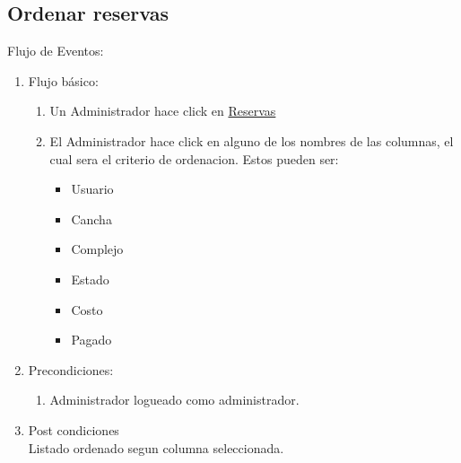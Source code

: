 \documentclass[a4paper,11pt]{article}
\begin{document}
\subsection{Ordenar reservas}

    \item Flujo de Eventos: 

    \begin{enumerate}

        \item Flujo básico:
	\begin{enumerate}
            \item Un Administrador hace click en \underline{Reservas}
	    \item El Administrador hace click en alguno de los nombres de las columnas, el cual sera el criterio de ordenacion.
Estos pueden ser:
	\begin{itemize}
	 \item Usuario
	\item Cancha
	\item Complejo
	\item Estado
	\item Costo
	\item Pagado
	\end{itemize}
	\end{enumerate}

    \item Precondiciones: \\
        \begin{enumerate}
            \item Administrador logueado como administrador.
        \end{enumerate}

    \item Post condiciones \\
        Listado ordenado segun columna seleccionada.

\end{enumerate}
\end{document}
